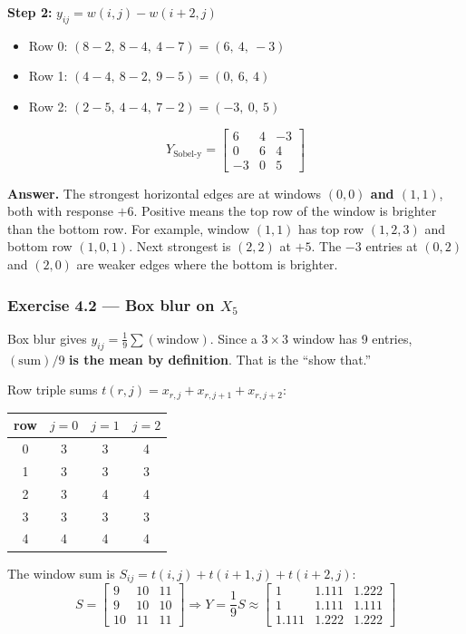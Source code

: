 \textbf{Step 2:} $y_{ij} = w(i,j) - w(i+2,j)$
\begin{itemize}[nosep]
  \item Row 0: $(8-2,\ 8-4,\ 4-7) = (6,\ 4,\ -3)$
  \item Row 1: $(4-4,\ 8-2,\ 9-5) = (0,\ 6,\ 4)$
  \item Row 2: $(2-5,\ 4-4,\ 7-2) = (-3,\ 0,\ 5)$
\end{itemize}
\[
Y_{\text{Sobel-y}} = \begin{bmatrix}6&4&-3\\0&6&4\\-3&0&5\end{bmatrix}
\]

\textbf{Answer.} The strongest horizontal edges are at windows \textbf{$(0,0)$ and $(1,1)$}, both with response $+6$. Positive means the top row of the window is brighter than the bottom row. For example, window $(1,1)$ has top row $(1,2,3)$ and bottom row $(1,0,1)$. Next strongest is $(2,2)$ at $+5$. The $-3$ entries at $(0,2)$ and $(2,0)$ are weaker edges where the bottom is brighter.

\subsubsection*{Exercise 4.2 --- Box blur on $X_5$}

Box blur gives $y_{ij} = \frac{1}{9}\sum(\text{window})$. Since a $3\times3$ window has 9 entries, $(\text{sum})/9$ \textbf{is the mean by definition}. That is the ``show that.''

Row triple sums $t(r,j) = x_{r,j} + x_{r,j+1} + x_{r,j+2}$:

\begin{center}
\begin{tabular}{cccc}
\toprule
row & $j=0$ & $j=1$ & $j=2$ \\
\midrule
0 & 3 & 3 & 4 \\
1 & 3 & 3 & 3 \\
2 & 3 & 4 & 4 \\
3 & 3 & 3 & 3 \\
4 & 4 & 4 & 4 \\
\bottomrule
\end{tabular}
\end{center}

The window sum is $S_{ij} = t(i,j) + t(i+1,j) + t(i+2,j)$:
\[
S = \begin{bmatrix}9&10&11\\9&10&10\\10&11&11\end{bmatrix} \Rightarrow Y = \frac{1}{9}S \approx \begin{bmatrix}1&1.111&1.222\\1&1.111&1.111\\1.111&1.222&1.222\end{bmatrix}
\]

